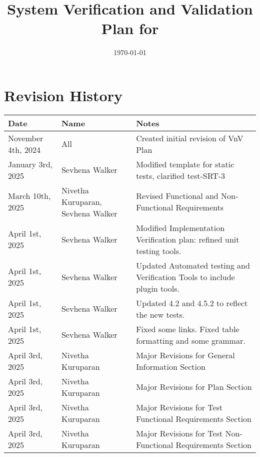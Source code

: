 \documentclass[12pt, titlepage]{article}
\begin{document}
\title{System Verification and Validation Plan for \progname{}}
\author{\authname}
\date{\today}

\maketitle


\section*{Revision History}

\begin{tabularx}{\textwidth}{p{4cm}p{4cm}X}
  \toprule {\bf Date} & {\bf Name} & {\bf Notes}\\
  \midrule
  November 4th, 2024 & All & Created initial revision of VnV Plan\\
January 3rd, 2025 & Sevhena Walker & Modified template for static tests, clarified test-SRT-3\\
  March 10th, 2025 & Nivetha Kuruparan, Sevhena Walker & Revised Functional and Non-Functional Requirements\\
  April 1st, 2025 & Sevhena Walker & Modified Implementation Verification plan: refined unit testing tools.\\
  April 1st, 2025 & Sevhena Walker & Updated Automated testing and Verification Tools to include plugin tools.\\
  April 1st, 2025 & Sevhena Walker & Updated 4.2 and 4.5.2 to reflect the new tests.\\
  April 1st, 2025 & Sevhena Walker & Fixed some links. Fixed table formatting and some grammar.\\
  April 3rd, 2025 & Nivetha Kuruparan & Major Revisions for General Information Section\\
  April 3rd, 2025 & Nivetha Kuruparan & Major Revisions for Plan Section\\
  April 3rd, 2025 & Nivetha Kuruparan & Major Revisions for Test Functional Requirements Section\\
  April 3rd, 2025 & Nivetha Kuruparan & Major Revisions for Test Non-Functional Requirements Section\\
  \bottomrule
\end{tabularx}

~\\
\end{document}
